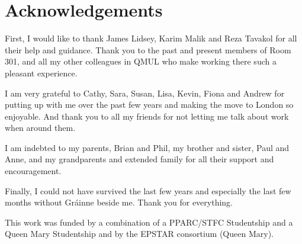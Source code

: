 % 
% 
% 
\chapter*{Acknowledgements}
\label{ch:acknowledgements}

First, I would like to thank James Lidsey, Karim Malik and Reza Tavakol for all their help and
guidance. Thank you to the past and present members of Room 301, and all my other colleagues in
QMUL who make working there such a pleasant experience.

I am very grateful to Cathy, Sara, Susan, Lisa, Kevin, Fiona and Andrew for putting up with me over
the past few years and making the move to London so enjoyable. And thank you to all my friends for
not letting me talk about work when around them.

I am indebted to my parents, Brian and Phil, my brother and sister, Paul and Anne, 
and my grandparents and extended family
for all their support and encouragement. 

Finally, I could not have survived the last few years and especially the last few months without 
Gr\'{a}inne beside me. Thank you for everything.

\vfill

This work was funded by a combination of a PPARC/STFC Studentship and a Queen Mary Studentship and
by the EPSTAR consortium (Queen Mary).  


